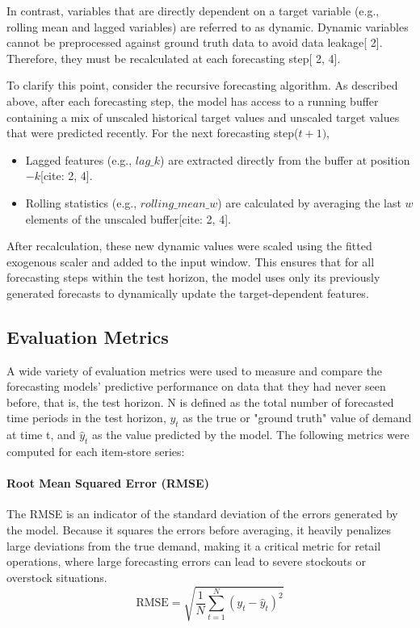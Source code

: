 In contrast, variables that are directly dependent on a target variable (e.g., rolling mean and lagged variables) are referred to as dynamic. Dynamic variables cannot be preprocessed against ground truth data to avoid data leakage[ 2]. Therefore, they must be recalculated at each forecasting step[ 2, 4].

To clarify this point, consider the recursive forecasting algorithm. As described above, after each forecasting step, the model has access to a running buffer containing a mix of unscaled historical target values and unscaled target values that were predicted recently. For the next forecasting step($t+1)$,

\begin{itemize}
    \item Lagged features (e.g., $lag\_k$) are extracted directly from the buffer at position $-k$[cite: 2, 4].
    \item Rolling statistics (e.g., $rolling\_mean\_w$) are calculated by averaging the last $w$ elements of the unscaled buffer[cite: 2, 4]. 
\end{itemize}

After recalculation, these new dynamic values were scaled using the fitted exogenous scaler and added to the input window. This ensures that for all forecasting steps within the test horizon, the model uses only its previously generated forecasts to dynamically update the target-dependent features.

\subsection{Evaluation Metrics}
\label{subsec:evaluation_metrics}

A wide variety of evaluation metrics were used to measure and compare the forecasting models' predictive performance on data that they had never seen before, that is, the test horizon. N is defined as the total number of forecasted time periods in the test horizon, $y_{t}$ as the true or "ground truth" value of demand at time t, and $\hat{y}_{t}$ as the value predicted by the model. The following metrics were computed for each item-store series:

\paragraph{Root Mean Squared Error (RMSE)}

The RMSE is an indicator of the standard deviation of the errors generated by the model. Because it squares the errors before averaging, it heavily penalizes large deviations from the true demand, making it a critical metric for retail operations, where large forecasting errors can lead to severe stockouts or overstock situations.
\[
\text{RMSE} = \sqrt{\frac{1}{N}\sum_{t=1}^{N}(y_t - \hat{y}_t)^2}
\]

